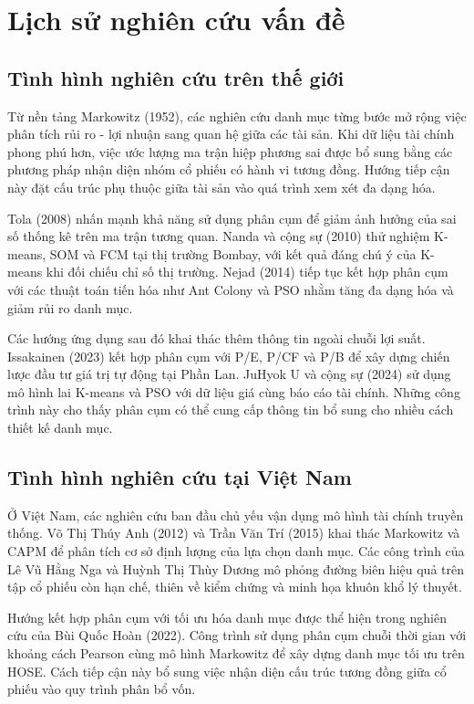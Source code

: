 \documentclass[12pt,a4paper,openany,oneside]{book}
\begin{document}
\section{Lịch sử nghiên cứu vấn đề}\label{Toc227188412}
\subsection{Tình hình nghiên cứu trên thế giới}
Từ nền tảng Markowitz (1952), các nghiên cứu danh mục từng bước mở rộng việc phân tích rủi ro - lợi nhuận sang quan hệ giữa các tài sản. Khi dữ liệu tài chính phong phú hơn, việc ước lượng ma trận hiệp phương sai được bổ sung bằng các phương pháp nhận diện nhóm cổ phiếu có hành vi tương đồng. Hướng tiếp cận này đặt cấu trúc phụ thuộc giữa tài sản vào quá trình xem xét đa dạng hóa.

Tola (2008) nhấn mạnh khả năng sử dụng phân cụm để giảm ảnh hưởng của sai số thống kê trên ma trận tương quan. Nanda và cộng sự (2010) thử nghiệm K-means, SOM và FCM tại thị trường Bombay, với kết quả đáng chú ý của K-means khi đối chiếu chỉ số thị trường. Nejad (2014) tiếp tục kết hợp phân cụm với các thuật toán tiến hóa như Ant Colony và PSO nhằm tăng đa dạng hóa và giảm rủi ro danh mục.

Các hướng ứng dụng sau đó khai thác thêm thông tin ngoài chuỗi lợi suất. Issakainen (2023) kết hợp phân cụm với P/E, P/CF và P/B để xây dựng chiến lược đầu tư giá trị tự động tại Phần Lan. JuHyok U và cộng sự (2024) sử dụng mô hình lai K-means và PSO với dữ liệu giá cùng báo cáo tài chính. Những công trình này cho thấy phân cụm có thể cung cấp thông tin bổ sung cho nhiều cách thiết kế danh mục.

\subsection{Tình hình nghiên cứu tại Việt Nam}
Ở Việt Nam, các nghiên cứu ban đầu chủ yếu vận dụng mô hình tài chính truyền thống. Võ Thị Thúy Anh (2012) và Trần Văn Trí (2015) khai thác Markowitz và CAPM để phân tích cơ sở định lượng của lựa chọn danh mục. Các công trình của Lê Vũ Hằng Nga và Huỳnh Thị Thùy Dương mô phỏng đường biên hiệu quả trên tập cổ phiếu còn hạn chế, thiên về kiểm chứng và minh họa khuôn khổ lý thuyết.

Hướng kết hợp phân cụm với tối ưu hóa danh mục được thể hiện trong nghiên cứu của Bùi Quốc Hoàn (2022). Công trình sử dụng phân cụm chuỗi thời gian với khoảng cách Pearson cùng mô hình Markowitz để xây dựng danh mục tối ưu trên HOSE. Cách tiếp cận này bổ sung việc nhận diện cấu trúc tương đồng giữa cổ phiếu vào quy trình phân bổ vốn.
\end{document}
